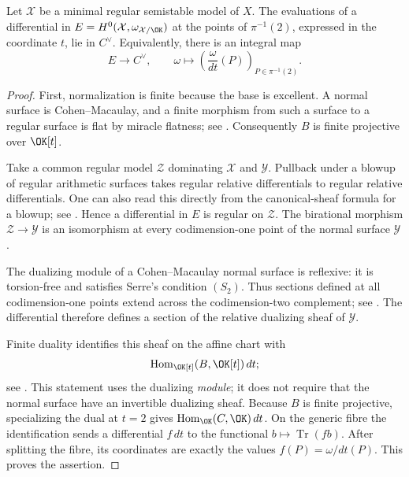 \begin{lemma}\label{lem:integral-evaluation}
Let $\mathcal X$ be a minimal regular semistable model of $X$.
The evaluations of a differential in
$E=H^0(\mathcal X,\omega_{\mathcal X/\OK})$ at the points of
$\pi^{-1}(2)$, expressed in the coordinate $t$, lie in $C^\vee$.
Equivalently, there is an integral map
\[
 E\longrightarrow C^\vee,
 \qquad \omega\longmapsto
       \left(\frac{\omega}{dt}(P)\right)_{P\in\pi^{-1}(2)}.
\]
\end{lemma}
\begin{proof}
First, normalization is finite because the base is excellent.
A normal surface is Cohen--Macaulay, and a finite morphism from
such a surface to a regular surface is flat by miracle flatness;
see \cite[Tag~00R4]{Stacks}. Consequently $B$ is finite projective
over $\OK[t]$.

Take a common regular model $\mathcal Z$ dominating
$\mathcal X$ and $\mathcal Y$. Pullback under a blowup of regular
arithmetic surfaces takes regular relative differentials to regular
relative differentials. One can also read this directly from the
canonical-sheaf formula for a blowup; see
\cite[Lemma~2.3.1]{Javanpeykar}.
Hence a differential in $E$ is regular on $\mathcal Z$.
The birational morphism $\mathcal Z\to\mathcal Y$ is an
isomorphism at every codimension-one point of the normal surface
$\mathcal Y$.

The dualizing module of a Cohen--Macaulay normal surface is
reflexive: it is torsion-free and satisfies Serre's condition
$(S_2)$. Thus sections defined at all codimension-one points extend
across the codimension-two complement; see
\cite[Tags~0AWQ and~0AVT, Lemmas~31.13.12--31.13.14]{Stacks}.
The differential therefore defines a section of the relative
dualizing sheaf of $\mathcal Y$.

Finite duality identifies this sheaf on the affine chart with
\[
 \operatorname{Hom}_{\OK[t]}(B,\OK[t])\,dt;
\]
see \cite[Tags~0BUL and~0C0I]{Stacks}.
This statement uses the dualizing \emph{module}; it does not require
that the normal surface have an invertible dualizing sheaf.
Because $B$ is finite projective, specializing the dual at $t=2$
gives $\operatorname{Hom}_{\OK}(C,\OK)\,dt$.
On the generic fibre the identification sends a differential
$f\,dt$ to the functional $b\mapsto\operatorname{Tr}(fb)$.
After splitting the fibre, its coordinates are exactly the values
$f(P)=\omega/dt(P)$. This proves the assertion.
\end{proof}

